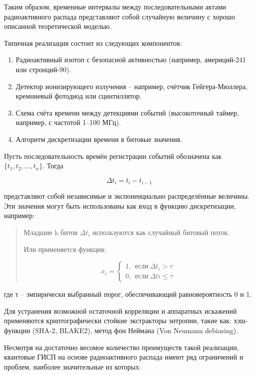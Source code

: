 Таким образом, временные интервалы между последовательными актами
радиоактивного распада представляют собой случайную величину с хорошо
описанной теоретической моделью.

Типичная реализация состоит из следующих компонентов:

\begin{enumerate}
\def\labelenumi{\arabic{enumi}.}
\item
  Радиоактивный изотоп с безопасной активностью (например, америций-241
  или стронций-90).
\item
  Детектор ионизирующего излучения -- например, счётчик Гейгера-Мюллера,
  кремниевый фотодиод или сцинтиллятор.
\item
  Схема счёта времени между детекциями событий (высокоточный таймер,
  например, с частотой 1--100 МГц).
\item
  Алгоритм дискретизации времени в битовые значения.
\end{enumerate}

Пусть последовательность времён регистрации событий обозначена как
\(\{ t_{1},t_{2},\ldots,t_{n}\}\). Тогда

\[\Delta t_{i} = t_{i} - t_{i - 1}\]

представляют собой независимые и экспоненциально распределённые
величины. Эти значения могут быть использованы как вход в функцию
дискретизации, например:

\begin{quote}
Младшие k битов \(\Delta t_{i}\)\hspace{0pt} используются как случайный
битовый поток.

Или применяется функция:

\[x_{i} = \left\{ \begin{array}{r}
1,\ \ если\ \Delta t_{i} > \tau \\
0,\ \ если\ \Delta ti \leq \tau
\end{array} \right.\ \]
\end{quote}

где τ -- эмпирически выбранный порог, обеспечивающий равновероятность 0
и 1.

Для устранения возможной остаточной корреляции и аппаратных искажений
применяются криптографически стойкие экстракторы энтропии, такие как:
хэш-функции (SHA-2, BLAKE2), метод фон Неймана (Von Neumann debiasing).

Несмотря на достаточно весомое количество преимуществ такой реализации,
квантовые ГИСП на основе радиоактивного распада имеют ряд ограничений и
проблем, наиболее значительные из которых:


